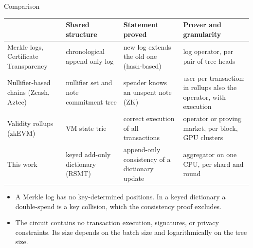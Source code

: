 \documentclass[aspectratio=169,10pt]{beamer}
\begin{document}
\begin{frame}{Comparison}
\footnotesize
\begin{tabular}{@{}>{\raggedright}p{2.5cm} >{\raggedright}p{2.9cm} >{\raggedright}p{3.4cm} >{\raggedright\arraybackslash}p{3.8cm}@{}}
\toprule
& Shared structure & Statement proved & Prover and granularity \\
\midrule
Merkle logs, Certificate Transparency & chronological append-only log & new log extends the old one (hash-based) & log operator, per pair of tree heads \\
\addlinespace
Nullifier-based chains (Zcash, Aztec) & nullifier set and note commitment tree & spender knows an unspent note (ZK) & user per transaction; in rollups also the operator, with execution \\
\addlinespace
Validity rollups (zkEVM) & VM state trie & correct execution of all transactions & operator or proving market, per block, GPU clusters \\
\addlinespace
\textcolor{uOrange}{This work} & keyed add-only dictionary (RSMT) & append-only consistency of a dictionary update & aggregator on one CPU, per shard and round \\
\bottomrule
\end{tabular}

\vspace{3mm}
\small
\begin{itemize}
  \item A Merkle log has no key-determined positions. In a keyed dictionary a double-spend is a key collision, which the consistency proof excludes.
  \item The circuit contains no transaction execution, signatures, or privacy constraints. Its size depends on the batch size and logarithmically on the tree size.
\end{itemize}
\end{frame}
\end{document}
